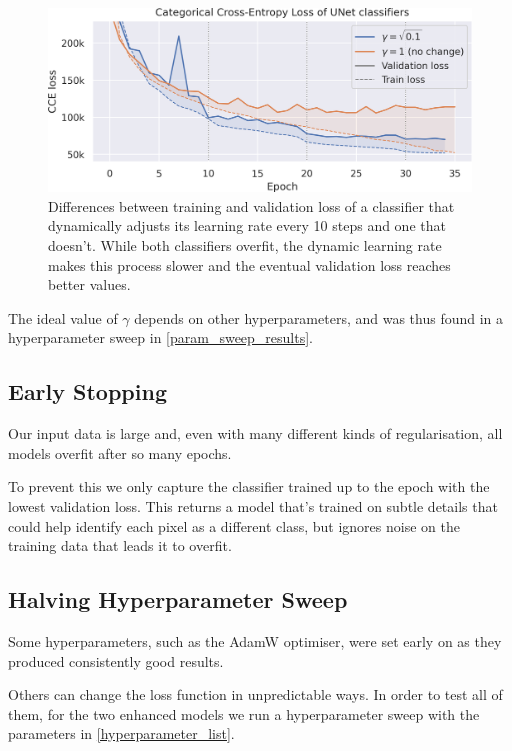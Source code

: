 \begin{figure}[h]
	\centering
	\includegraphics[width=.90\textwidth]{gamma_vs_nogamma.png}
	\caption{Differences between training and validation loss of a classifier that dynamically adjusts its learning rate every 10 steps and one that doesn't. While both classifiers overfit, the dynamic learning rate makes this process slower and the eventual validation loss reaches better values.}
	\label{gamma_vs_nogamma}
\end{figure}

The ideal value of $\gamma$ depends on other hyperparameters, and was thus found in a hyperparameter sweep in \cref{param_sweep_results}.

\subsection{Early Stopping}

Our input data is large and, even with many different kinds of regularisation, all models overfit after so many epochs.

To prevent this we only capture the classifier trained up to the epoch with the lowest validation loss.
This returns a model that's trained on subtle details that could help identify each pixel as a different class, but ignores noise on the training data that leads it to overfit.

\subsection{Halving Hyperparameter Sweep}
\label{param_sweep}
Some hyperparameters, such as the AdamW optimiser, were set early on as they produced consistently good results.

Others can change the loss function in unpredictable ways.
In order to test all of them, for the two enhanced models we run a hyperparameter sweep with the parameters in \cref{hyperparameter_list}.

